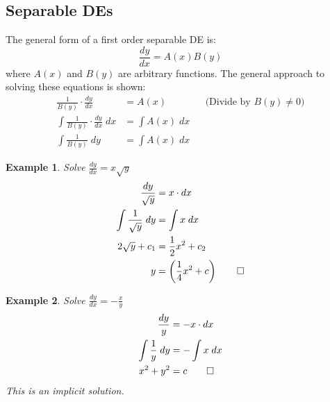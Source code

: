 \documentclass{report}
\newtheorem{ex}{Example}[section]
\begin{document}
\subsection{Separable DEs}
The general form of a first order separable DE is:
$$\frac{dy}{dx} = A(x) B(y)$$
where $A(x)$ and $B(y)$ are arbitrary functions. The general approach to solving these equations is shown:
\begin{align*}
    \frac{1}{B(y)}\cdot \frac{dy}{dx} &= A(x) && \text{(Divide by } B(y) \neq 0) \\
    \int \frac{1}{B(y)}\cdot \frac{dy}{dx} \; dx &= \int A(x) \; dx \\
    \int \frac{1}{B(y)} \; dy &= \int A(x) \; dx
\end{align*}
\begin{ex}
Solve $\frac{dy}{dx} = x\sqrt{y}$
\begin{align*}
    \frac{dy}{\sqrt{y}} &= x \cdot dx \\
    \int \frac{1}{\sqrt{y}} \; dy &= \int x \; dx \\
    2 \sqrt{y} + c_1 &= \frac{1}{2} x^2 + c_2 \\
    y &= \left(\frac{1}{4}x^2 + c \right) \qed 
\end{align*}
\end{ex}
\begin{ex}
Solve $\frac{dy}{dx} = -\frac{x}{y}$
\begin{align*}
    \frac{dy}{y} &= -x \cdot dx \\
    \int \frac{1}{y} \; dy &= - \int x \; dx \\
    x^2 + y^2 &= c \qed
\end{align*}
This is an implicit solution.
\end{ex}
\end{document}
